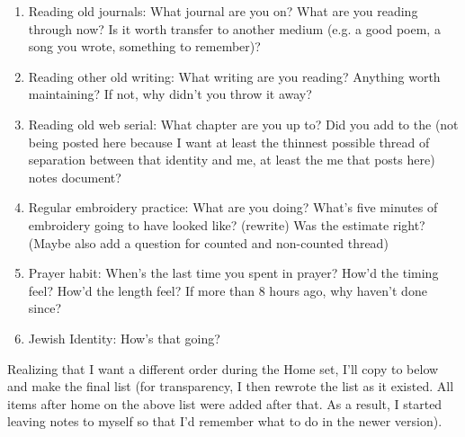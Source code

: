 \documentclass[12pt]{article}
\renewcommand{\,}{\textsuperscript{,}}
\begin{document}
\begin{enumerate}
\item Reading old journals: What journal are you on? What are you reading through now? Is it worth transfer to another medium (e.g. a good poem, a song you wrote, something to remember)?

\item Reading other old writing: What writing are you reading? Anything worth maintaining? If not, why didn't you throw it away?

\item Reading old web serial: What chapter are you up to? Did you add to the (not being posted here because I want at least the thinnest possible thread of separation between that identity and me, at least the me that posts here) notes document?

\item Regular embroidery practice: What are you doing? What's five minutes of embroidery going to have looked like? (rewrite) Was the estimate right? (Maybe also add a question for counted and non-counted thread)

\item Prayer habit: When's the last time you spent in prayer? How'd the timing feel? How'd the length feel? If more than 8 hours ago, why haven't done since?

\item Jewish Identity: How's that going?

\end{enumerate}

Realizing that I want a different order during the Home set, I'll copy to below and make the final list (for transparency, I then rewrote the list as it existed. All items after home on the above list were added after that. As a result, I started leaving notes to myself so that I'd remember what to do in the newer version).
\end{document}
